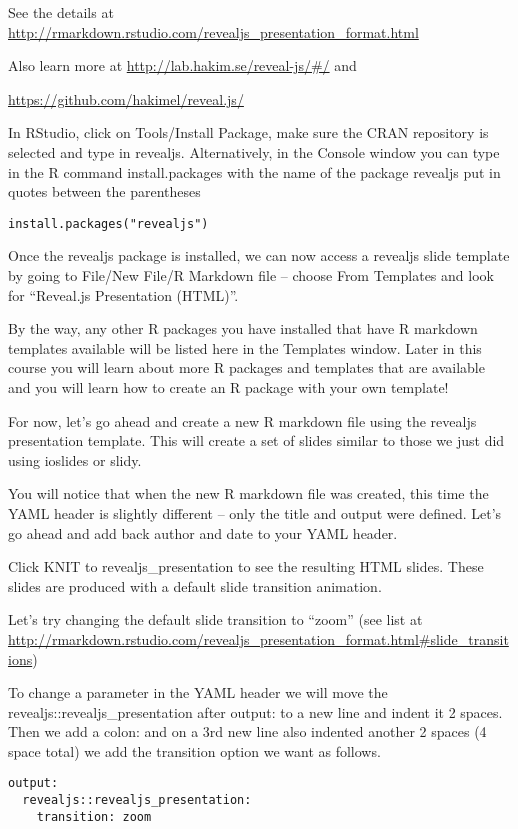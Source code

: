 \documentclass[]{book}
\theoremstyle{definition}
\theoremstyle{definition}
\theoremstyle{definition}
\theoremstyle{remark}
\begin{document}
See the details at
\url{http://rmarkdown.rstudio.com/revealjs_presentation_format.html}

Also learn more at \url{http://lab.hakim.se/reveal-js/\#/} and

\url{https://github.com/hakimel/reveal.js/}

In RStudio, click on Tools/Install Package, make sure the CRAN
repository is selected and type in revealjs. Alternatively, in the
Console window you can type in the R command install.packages with the
name of the package revealjs put in quotes between the parentheses

\texttt{install.packages("revealjs")}

Once the revealjs package is installed, we can now access a revealjs
slide template by going to File/New File/R Markdown file -- choose From
Templates and look for ``Reveal.js Presentation (HTML)''.

By the way, any other R packages you have installed that have R markdown
templates available will be listed here in the Templates window. Later
in this course you will learn about more R packages and templates that
are available and you will learn how to create an R package with your
own template!

For now, let's go ahead and create a new R markdown file using the
revealjs presentation template. This will create a set of slides similar
to those we just did using ioslides or slidy.

You will notice that when the new R markdown file was created, this time
the YAML header is slightly different -- only the title and output were
defined. Let's go ahead and add back author and date to your YAML
header.

Click KNIT to revealjs\_presentation to see the resulting HTML slides.
These slides are produced with a default slide transition animation.

Let's try changing the default slide transition to ``zoom'' (see list at
\url{http://rmarkdown.rstudio.com/revealjs_presentation_format.html\#slide_transitions})

To change a parameter in the YAML header we will move the
revealjs::revealjs\_presentation after output: to a new line and indent
it 2 spaces. Then we add a colon: and on a 3rd new line also indented
another 2 spaces (4 space total) we add the transition option we want as
follows.

\begin{verbatim}
output: 
  revealjs::revealjs_presentation:
    transition: zoom
\end{verbatim}
\end{document}
